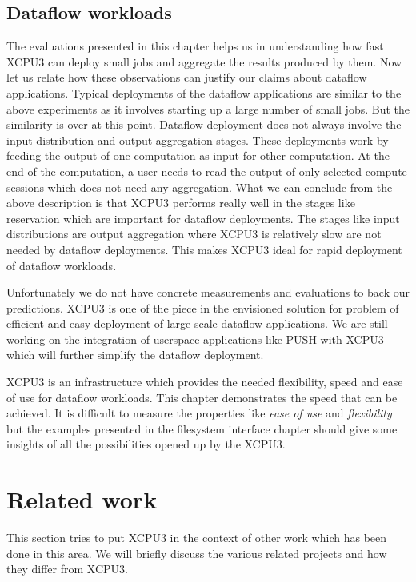 \documentclass{sig-alternate}
\begin{document}
\subsection{Dataflow workloads}
The evaluations presented in this chapter helps us in understanding how fast
XCPU3 can deploy small jobs and aggregate the results produced by them.  Now
let us relate how these observations can justify our claims about dataflow
applications. Typical deployments of the dataflow applications are similar to
the above experiments as it involves starting up a large number of small jobs.
But the similarity is over at this point. Dataflow deployment does not always
involve the input distribution and output aggregation stages.  These deployments
work by feeding the output of one computation as input for other computation. 
At the end of the computation, a user needs to read the output of only selected
compute sessions which does not need any aggregation.  What we can conclude from
the above description is that XCPU3 performs really well in the stages like
reservation which are important for dataflow deployments.  The stages like input
distributions are output aggregation where XCPU3 is relatively slow are not
needed by dataflow deployments.  This makes XCPU3 ideal for rapid deployment of
dataflow workloads.

Unfortunately we do not have concrete measurements and evaluations to back our
predictions.  XCPU3 is one of the piece in the envisioned solution for problem
of efficient and easy deployment of large-scale dataflow applications.   We are
still working on the integration of userspace applications like
PUSH\cite{PODC:Push} with XCPU3 which will further simplify the dataflow
deployment.


XCPU3 is an infrastructure which provides the needed flexibility, speed and 
ease of use for dataflow workloads.  This chapter demonstrates the speed that
can be achieved.  It is difficult to measure the properties like \textit{ease of
use} and \textit{flexibility} but the examples presented in the filesystem
interface chapter should give some insights of all the possibilities opened up
by the XCPU3.


\section{Related work}


This section tries to put XCPU3 in the context of other work which 
has been done in this area.  We will briefly discuss the various related
projects and how they differ from XCPU3.
\end{document}
